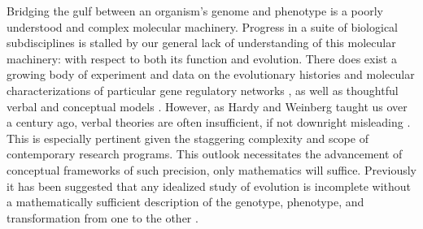 \documentclass[11 pt]{article}
\begin{document}
Bridging the gulf between an organism's genome and phenotype is a poorly understood and complex molecular machinery. Progress in a suite of biological subdisciplines is stalled by our general lack of understanding of this molecular machinery: with respect to both its function and evolution. There does exist a growing body of experiment and data on the evolutionary histories and molecular characterizations of particular gene regulatory networks \citep{jaeger2011gap, davidson2006gene, israel2016comparative}, as well as thoughtful verbal and conceptual models \citep{true2001developmental, gwagner1}. However, as Hardy and Weinberg taught us over a century ago, verbal theories are often insufficient, if not downright misleading \citep{hardy1908mendelian, weinberg1908vererbungsgesetze, servedio2014not}. This is especially pertinent given the staggering complexity and scope of contemporary research programs. This outlook necessitates the advancement of conceptual frameworks of such precision, only mathematics will suffice. Previously it has been suggested that any idealized study of evolution is incomplete without a mathematically sufficient description of the genotype, phenotype, and transformation from one to the other \citep{Lewontin1974genetic}.%



\end{document}
